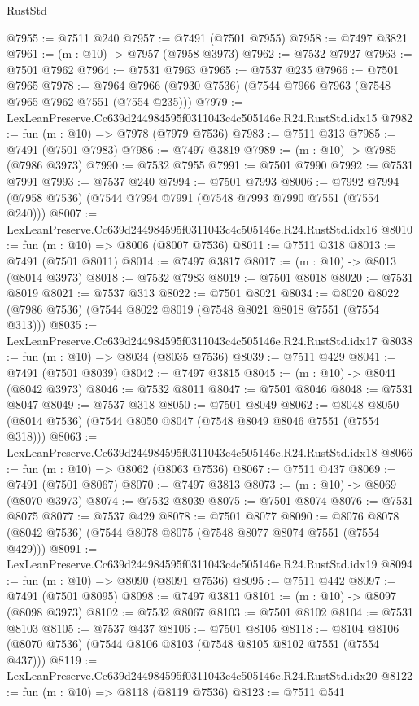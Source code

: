 \begin{lexlean}{RustStd}
\begin{coremodule}
@7955 := @7511 @240
@7957 := @7491 (@7501 @7955)
@7958 := @7497 @3821
@7961 := (m : @10) -> @7957 (@7958 @3973)
@7962 := @7532 @7927
@7963 := @7501 @7962
@7964 := @7531 @7963
@7965 := @7537 @235
@7966 := @7501 @7965
@7978 := @7964 @7966 (@7930 @7536) (@7544 @7966 @7963 (@7548 @7965 @7962 @7551 (@7554 @235)))
@7979 := LexLeanPreserve.Cc639d244984595f0311043c4c505146e.R24.RustStd.idx15
@7982 := fun (m : @10) => @7978 (@7979 @7536)
@7983 := @7511 @313
@7985 := @7491 (@7501 @7983)
@7986 := @7497 @3819
@7989 := (m : @10) -> @7985 (@7986 @3973)
@7990 := @7532 @7955
@7991 := @7501 @7990
@7992 := @7531 @7991
@7993 := @7537 @240
@7994 := @7501 @7993
@8006 := @7992 @7994 (@7958 @7536) (@7544 @7994 @7991 (@7548 @7993 @7990 @7551 (@7554 @240)))
@8007 := LexLeanPreserve.Cc639d244984595f0311043c4c505146e.R24.RustStd.idx16
@8010 := fun (m : @10) => @8006 (@8007 @7536)
@8011 := @7511 @318
@8013 := @7491 (@7501 @8011)
@8014 := @7497 @3817
@8017 := (m : @10) -> @8013 (@8014 @3973)
@8018 := @7532 @7983
@8019 := @7501 @8018
@8020 := @7531 @8019
@8021 := @7537 @313
@8022 := @7501 @8021
@8034 := @8020 @8022 (@7986 @7536) (@7544 @8022 @8019 (@7548 @8021 @8018 @7551 (@7554 @313)))
@8035 := LexLeanPreserve.Cc639d244984595f0311043c4c505146e.R24.RustStd.idx17
@8038 := fun (m : @10) => @8034 (@8035 @7536)
@8039 := @7511 @429
@8041 := @7491 (@7501 @8039)
@8042 := @7497 @3815
@8045 := (m : @10) -> @8041 (@8042 @3973)
@8046 := @7532 @8011
@8047 := @7501 @8046
@8048 := @7531 @8047
@8049 := @7537 @318
@8050 := @7501 @8049
@8062 := @8048 @8050 (@8014 @7536) (@7544 @8050 @8047 (@7548 @8049 @8046 @7551 (@7554 @318)))
@8063 := LexLeanPreserve.Cc639d244984595f0311043c4c505146e.R24.RustStd.idx18
@8066 := fun (m : @10) => @8062 (@8063 @7536)
@8067 := @7511 @437
@8069 := @7491 (@7501 @8067)
@8070 := @7497 @3813
@8073 := (m : @10) -> @8069 (@8070 @3973)
@8074 := @7532 @8039
@8075 := @7501 @8074
@8076 := @7531 @8075
@8077 := @7537 @429
@8078 := @7501 @8077
@8090 := @8076 @8078 (@8042 @7536) (@7544 @8078 @8075 (@7548 @8077 @8074 @7551 (@7554 @429)))
@8091 := LexLeanPreserve.Cc639d244984595f0311043c4c505146e.R24.RustStd.idx19
@8094 := fun (m : @10) => @8090 (@8091 @7536)
@8095 := @7511 @442
@8097 := @7491 (@7501 @8095)
@8098 := @7497 @3811
@8101 := (m : @10) -> @8097 (@8098 @3973)
@8102 := @7532 @8067
@8103 := @7501 @8102
@8104 := @7531 @8103
@8105 := @7537 @437
@8106 := @7501 @8105
@8118 := @8104 @8106 (@8070 @7536) (@7544 @8106 @8103 (@7548 @8105 @8102 @7551 (@7554 @437)))
@8119 := LexLeanPreserve.Cc639d244984595f0311043c4c505146e.R24.RustStd.idx20
@8122 := fun (m : @10) => @8118 (@8119 @7536)
@8123 := @7511 @541

\end{coremodule}
\end{lexlean}
